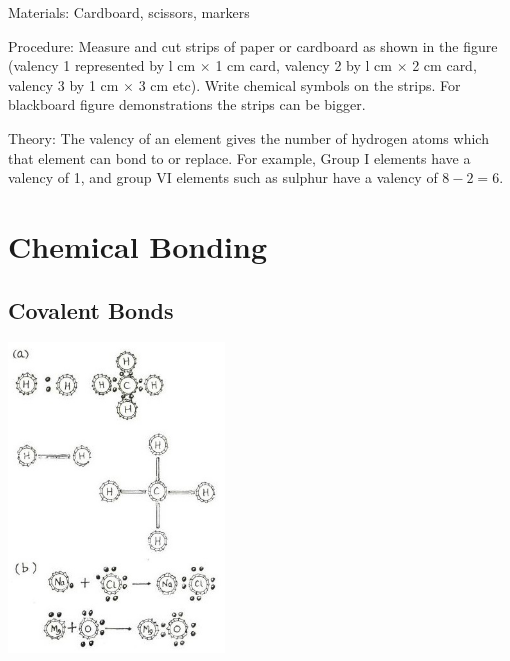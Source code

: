 \begin{multicols}{2}
\begin{description*}
\item[Materials:]{Cardboard, scissors, markers}
\item[Procedure:]{Measure and cut strips of paper or cardboard as shown in the figure (valency 1 represented by
l cm $\times$ 1 cm card, valency 2 by l cm $\times$ 2 cm card,
valency 3 by 1 cm $\times$ 3 cm etc). Write chemical
symbols on the strips. For blackboard figure
demonstrations the strips can be bigger.}
\item[Theory:]{The valency of an element gives the number of
hydrogen atoms which that element can bond to or
replace. For example, Group I elements have a valency of 1, and group VI elements such as sulphur have a valency of $8-2=6$.}
\end{description*}

\vfill
\columnbreak


\section*{Chemical Bonding}


\subsection{Covalent Bonds}

\begin{center}
\includegraphics[width=0.43\textwidth]{./img/source/covalent-bonds.jpg}
\end{center}


\end{multicols}
